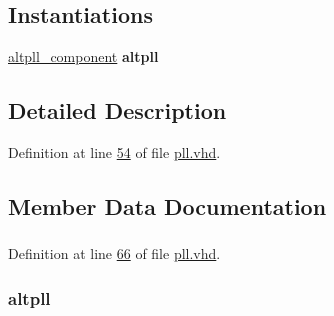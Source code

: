 \subsection*{Instantiations}
 \begin{DoxyCompactItemize}
\item 
\hyperlink{classpll_1_1_s_y_n_a70fc906d546df6812934a5430ac231a3}{altpll\+\_\+component}  {\bfseries altpll}   
\end{DoxyCompactItemize}


\subsection{Detailed Description}


Definition at line \hyperlink{pll_8vhd_source_l00054}{54} of file \hyperlink{pll_8vhd_source}{pll.\+vhd}.



\subsection{Member Data Documentation}
\hypertarget{classpll_1_1_s_y_n_ad45c11bbc2e898d68e19fa2eb5ba73d5}{}
\subsubsection[{altpll}]{ {\bfseries \textcolor{vhdlchar}{ }} \hspace{0.3cm}{\ttfamily [Component]}}\label{classpll_1_1_s_y_n_ad45c11bbc2e898d68e19fa2eb5ba73d5}


Definition at line \hyperlink{pll_8vhd_source_l00066}{66} of file \hyperlink{pll_8vhd_source}{pll.\+vhd}.

\hypertarget{classpll_1_1_s_y_n_a70fc906d546df6812934a5430ac231a3}{}
\subsubsection[{altpll\+\_\+component}]{ {\bfseries \textcolor{vhdlchar}{altpll}\textcolor{vhdlchar}{ }} \hspace{0.3cm}{\ttfamily [Instantiation]}}\label{classpll_1_1_s_y_n_a70fc906d546df6812934a5430ac231a3}


